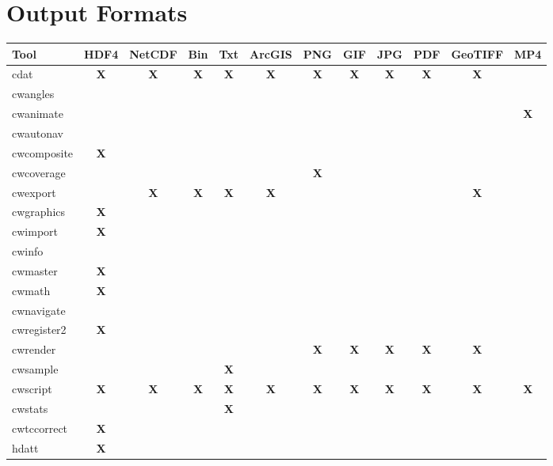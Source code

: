 \newpage

\section{Output Formats}
\label{output_formats}

\begin{tabular}{lccccccccccc}
\hline
\textbf{Tool} & \textbf{HDF4} & \textbf{NetCDF} & \textbf{Bin} & \textbf{Txt} & \textbf{ArcGIS} & \textbf{PNG} & \textbf{GIF} & \textbf{JPG} & \textbf{PDF} & \textbf{GeoTIFF} & \textbf{MP4} \\
\hline
cdat & \textbf{X} & \textbf{X} & \textbf{X} & \textbf{X} & \textbf{X} & \textbf{X} & \textbf{X} & \textbf{X} & \textbf{X} & \textbf{X} &  \\
cwangles &  &  &  &  &  &  &  &  &  &  &  \\
cwanimate &  &  &  &  &  &  &  &  &  &  & \textbf{X} \\
cwautonav &  &  &  &  &  &  &  &  &  &  &  \\
cwcomposite & \textbf{X} &  &  &  &  &  &  &  &  &  &  \\
cwcoverage &  &  &  &  &  & \textbf{X} &  &  &  &  &  \\
cwexport &  & \textbf{X} & \textbf{X} & \textbf{X} & \textbf{X} &  &  &  &  & \textbf{X} &  \\
cwgraphics & \textbf{X} &  &  &  &  &  &  &  &  &  &  \\
cwimport & \textbf{X} &  &  &  &  &  &  &  &  &  &  \\
cwinfo &  &  &  &  &  &  &  &  &  &  &  \\
cwmaster & \textbf{X} &  &  &  &  &  &  &  &  &  &  \\
cwmath & \textbf{X} &  &  &  &  &  &  &  &  &  &  \\
cwnavigate &  &  &  &  &  &  &  &  &  &  &  \\
cwregister2 & \textbf{X} &  &  &  &  &  &  &  &  &  &  \\
cwrender & & & & & & \textbf{X} & \textbf{X} & \textbf{X} & \textbf{X} & \textbf{X} & \\
cwsample & & & & \textbf{X} & & & & & & & \\
cwscript & \textbf{X} & \textbf{X} & \textbf{X} & \textbf{X} & \textbf{X} & \textbf{X} & \textbf{X} & \textbf{X} & \textbf{X} & \textbf{X} & \textbf{X} \\
cwstats & & & & \textbf{X} & & & & & & & \\
cwtccorrect & \textbf{X} &  &  &  &  &  &  &  &  &  &  \\
hdatt & \textbf{X} &  &  &  &  &  &  &  &  &  &  \\
\hline
\end{tabular}

